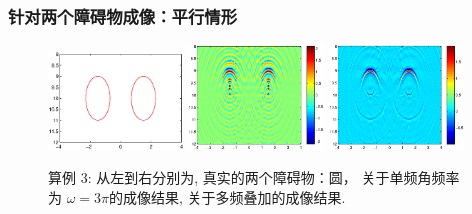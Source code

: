 \documentclass[8pt]{beamer}
\newcommand{\om}{\omega}
\begin{document}
\begin{frame}
\frametitle{针对两个障碍物成像：平行情形}
\begin{figure}[h]
	
		\centering
	\includegraphics[width=0.32\textwidth,height=0.33\textheight]{./graphic/bi_circle_profile.eps}
	\includegraphics[width=0.32\textwidth]{./graphic/bi_circle_3pi.eps}
	\includegraphics[width=0.32\textwidth]{./graphic/bi_circle.eps}
	
	\caption{算例 3: 从左到右分别为,  真实的两个障碍物：圆， 关于单频角频率为 $\om=3\pi$的成像结果, 关于多频叠加的成像结果.}
\end{figure}
\end{frame}
\end{document}
